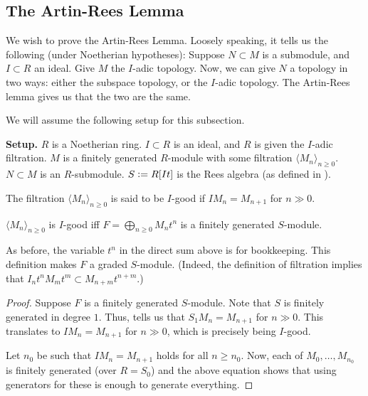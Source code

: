 \documentclass[12pt]{article}
\begin{document}
\subsection{The Artin-Rees Lemma}

We wish to prove the Artin-Rees Lemma. Loosely speaking, it tells us the following (under Noetherian hypotheses): Suppose $N \subset M$ is a submodule, and $I \subset R$ an ideal. Give $M$ the $I$-adic topology. Now, we can give $N$ a topology in two ways: either the subspace topology, or the $I$-adic topology. The Artin-Rees lemma gives us that the two are the same.

We will assume the following setup for this subsection.

\begin{tcolorbox}
	\textbf{Setup.} $R$ is a Noetherian ring. $I \subset R$ is an ideal, and $R$ is given the $I$-adic filtration. \newline
	$M$ is a finitely generated $R$-module with some filtration $\langle M_{n} \rangle_{n \ge 0}$. $N \subset M$ is an $R$-submodule. \newline
	$S \vcentcolon= R[It]$ is the Rees algebra (as defined in ).
\end{tcolorbox}

\begin{defn}
	The filtration $\langle M_{n} \rangle_{n \ge 0}$ is said to be $I$-good if $I M_{n} = M_{n + 1}$ for $n \gg 0$.
\end{defn}

\begin{lem} \label{lem:I-good-finitely-generated}
	$\langle M_{n} \rangle_{n \ge 0}$ is $I$-good iff $F = \bigoplus_{n \ge 0} M_{n} t^{n}$ is a finitely generated $S$-module.
\end{lem}
As before, the variable $t^{n}$ in the direct sum above is for bookkeeping. This definition makes $F$ a graded $S$-module. (Indeed, the definition of filtration implies that $I_{n}t^{n} M_{m}t^{m} \subset M_{n + m}t^{n + m}$.)
\begin{proof} 
	\backward Suppose $F$ is a finitely generated $S$-module. Note that $S$ is finitely generated in degree $1$. Thus,  tells us that $S_{1} M_{n} = M_{n + 1}$ for $n \gg 0$. This translates to $I M_{n} = M_{n + 1}$ for $n \gg 0$, which is precisely being $I$-good.

	\forward Let $n_{0}$ be such that $I M_{n} = M_{n + 1}$ holds for all $n \ge n_{0}$. \newline
	Now, each of $M_{0}, \ldots, M_{n_{0}}$ is finitely generated (over $R = S_{0}$) and the above equation shows that using generators for these is enough to generate everything.
\end{proof}
\end{document}
